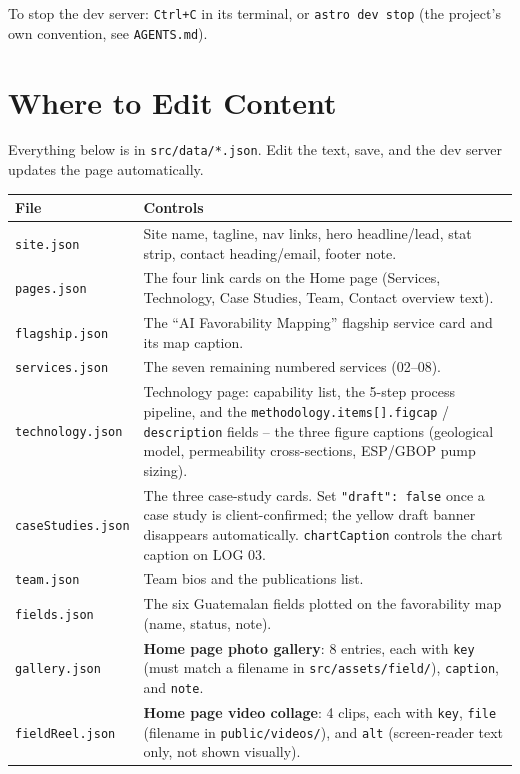 \documentclass[11pt]{article}
\newcommand{\code}[1]{\texttt{\small #1}}
\newcommand{\file}[1]{\texttt{\small\color{ixaccent}#1}}
\begin{document}
To stop the dev server: \code{Ctrl+C} in its terminal, or \code{astro dev stop}
(the project's own convention, see \file{AGENTS.md}).

\section{Where to Edit Content}

Everything below is in \file{src/data/*.json}. Edit the text, save, and the
dev server updates the page automatically.

\begin{longtable}{@{}p{4.6cm}p{9.6cm}@{}}
\toprule
\textbf{File} & \textbf{Controls} \\
\midrule
\endhead
\file{site.json} & Site name, tagline, nav links, hero headline/lead, stat
  strip, contact heading/email, footer note. \\[4pt]
\file{pages.json} & The four link cards on the Home page (Services,
  Technology, Case Studies, Team, Contact overview text). \\[4pt]
\file{flagship.json} & The ``AI Favorability Mapping'' flagship service card
  and its map caption. \\[4pt]
\file{services.json} & The seven remaining numbered services (02--08). \\[4pt]
\file{technology.json} & Technology page: capability list, the 5-step
  process pipeline, and the \code{methodology.items[].figcap} /
  \code{description} fields -- the three figure captions (geological model,
  permeability cross-sections, ESP/GBOP pump sizing). \\[4pt]
\file{caseStudies.json} & The three case-study cards. Set
  \code{"draft": false} once a case study is client-confirmed; the yellow
  draft banner disappears automatically. \code{chartCaption} controls the
  chart caption on LOG 03. \\[4pt]
\file{team.json} & Team bios and the publications list. \\[4pt]
\file{fields.json} & The six Guatemalan fields plotted on the favorability
  map (name, status, note). \\[4pt]
\file{gallery.json} & \textbf{Home page photo gallery}: 8 entries, each with
  \code{key} (must match a filename in \file{src/assets/field/}),
  \code{caption}, and \code{note}. \\[4pt]
\file{fieldReel.json} & \textbf{Home page video collage}: 4 clips, each with
  \code{key}, \code{file} (filename in \file{public/videos/}), and
  \code{alt} (screen-reader text only, not shown visually). \\
\bottomrule
\end{longtable}
\end{document}
